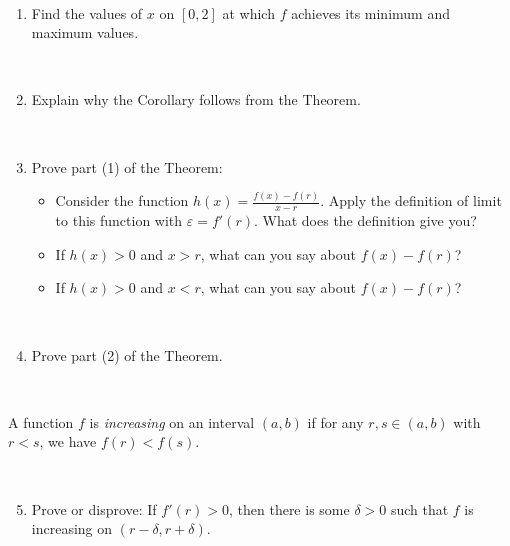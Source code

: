 \documentclass[12pt]{amsart}
\newcommand{\e}{\varepsilon}
\begin{document}
 \
 
 \begin{enumerate}
 
 \item Find the values of $x$ on $[0,2]$ at which $f$ achieves its minimum and maximum values.
 
 \ 
 
 \item Explain why the Corollary follows from the Theorem.
 
 \
 
 
 \item Prove part (1) of the Theorem:
 \begin{itemize}
 \item Consider the function $h(x) = \frac{ f(x) - f(r) }{x-r}$. Apply the definition of limit to this function with $\e = f'(r)$. What does the definition give you?
 \item If $h(x) > 0$ and $x>r$, what can you say about $f(x) - f(r)$?
  \item If $h(x) > 0$ and $x<r$, what can you say about $f(x) - f(r)$?
  \end{itemize}


\

 \item Prove part (2) of the Theorem.
 
\end{enumerate}

\
 
 \noindent A function $f$ is \emph{increasing} on an interval $(a,b)$ if for any $r,s\in (a,b)$ with $r<s$, we have $f(r)<f(s)$.
 
 \
  \begin{enumerate}\setcounter{enumi}{4}
 \item Prove or disprove: If $f'(r)>0$, then there is some $\delta>0$ such that $f$ is increasing on $(r-\delta,r+\delta)$.
\end{enumerate}
\end{document}
